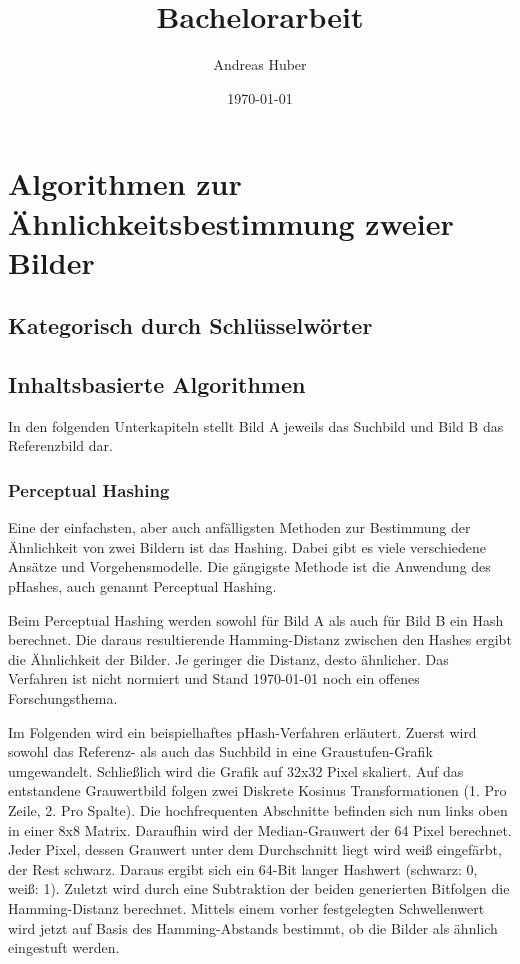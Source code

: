 \documentclass[a4paper,12pt]{article}
\title{Bachelorarbeit}
\author{Andreas Huber}
\date{\today}
\begin{document}

\newpage


\tableofcontents

\newpage


\newpage


\newpage


\newpage
{}



\section{Algorithmen zur Ähnlichkeitsbestimmung zweier Bilder}
\subsection{Kategorisch durch Schlüsselwörter}
\subsection{Inhaltsbasierte Algorithmen}
In den folgenden Unterkapiteln stellt Bild A jeweils das Suchbild und Bild B
das Referenzbild dar.
\newpage
\subsubsection{Perceptual Hashing}
Eine der einfachsten, aber auch anfälligsten Methoden zur Bestimmung der
Ähnlichkeit von zwei Bildern ist das Hashing. Dabei gibt es viele verschiedene
Ansätze und Vorgehensmodelle. Die gängigste Methode ist die Anwendung des
pHashes, auch genannt Perceptual Hashing.

Beim Perceptual Hashing werden sowohl für Bild A als auch für Bild B ein Hash
berechnet. Die daraus resultierende Hamming-Distanz zwischen den Hashes ergibt
die Ähnlichkeit der Bilder. Je geringer die Distanz, desto ähnlicher. Das
Verfahren ist nicht normiert und Stand \today{} noch ein offenes
Forschungsthema.

Im Folgenden wird ein beispielhaftes pHash-Verfahren erläutert. Zuerst wird
sowohl das Referenz- als auch das Suchbild in eine Graustufen-Grafik
umgewandelt. Schließlich wird die Grafik auf 32x32 Pixel skaliert. Auf das
entstandene Grauwertbild folgen zwei Diskrete Kosinus Transformationen (1. Pro
Zeile, 2. Pro Spalte). Die hochfrequenten Abschnitte befinden sich nun links
oben in einer 8x8 Matrix. Daraufhin wird der Median-Grauwert der 64 Pixel
berechnet. Jeder Pixel, dessen Grauwert unter dem Durchschnitt liegt wird weiß
eingefärbt, der Rest schwarz. Daraus ergibt sich ein 64-Bit langer Hashwert
(schwarz: 0, weiß: 1). Zuletzt wird durch eine Subtraktion der beiden
generierten Bitfolgen die Hamming-Distanz berechnet. Mittels einem vorher
festgelegten Schwellenwert wird jetzt auf Basis des Hamming-Abstands bestimmt,
ob die Bilder als ähnlich eingestuft werden.
\end{document}
